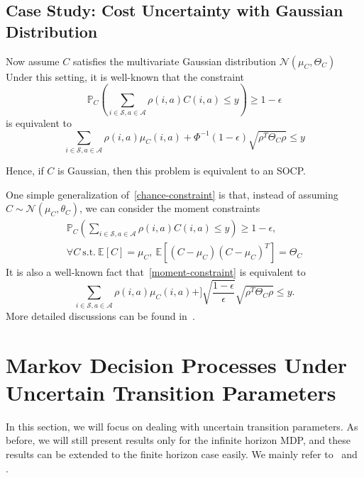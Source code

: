\documentclass[11pt,reqno]{amsart}
\theoremstyle{definition}
\numberwithin{equation}{section}
\theoremstyle{remark}
\begin{document}

\subsection{Case Study: Cost Uncertainty with Gaussian Distribution}
Now assume $C$ satisfies the multivariate Gaussian distribution $\mathcal{N}(\mu_C,\Theta_C)$ Under this setting, it is well-known that the constraint
\begin{equation}\label{chance-constraint}
    \mathbb{P}_C\left(\sum_{i\in\mathcal{S},a\in\mathcal{A}}\rho(i,a)C(i,a)\leq y\right)\geq1-\epsilon
\end{equation}
is equivalent to
\begin{equation}\label{socp}
    \sum_{i\in\mathcal{S},a\in\mathcal{A}}\rho(i,a)\mu_C(i,a)+\Phi^{-1}(1-\epsilon)\sqrt{\rho^T\Theta_C\rho}\leq y
\end{equation}

Hence, if $C$ is Gaussian, then this problem is equivalent to an SOCP.

\medskip

One simple generalization of~\ref{chance-constraint} is that, instead of assuming $C\sim\mathcal{N}(\mu_C,\theta_C)$, we can consider the moment constraints
\begin{equation}\label{moment-constraint}
\begin{gathered}
\mathbb{P}_C\left(\sum_{i\in\mathcal{S},a\in\mathcal{A}}\rho(i,a)C(i,a)\leq y\right)\geq1-\epsilon,\\
\forall C~\text{s.t.}~\mathbb{E}[C]=\mu_C,~\mathbb{E}\left[(C-\mu_C)(C-\mu_C)^T\right]=\Theta_C
\end{gathered}
\end{equation}
It is also a well-known fact that~\ref{moment-constraint} is equivalent to
\begin{equation}\label{generalized-chebyshev}
    \sum_{i\in\mathcal{S},a\in\mathcal{A}}\rho(i,a)\mu_C(i,a)+]\sqrt{\frac{1-\epsilon}{\epsilon}}\sqrt{\rho^T\Theta_C\rho}\leq y.
\end{equation}
More detailed discussions can be found in~\cite{ben2009robust}.

\section{Markov Decision Processes Under Uncertain Transition Parameters}
In this section, we will focus on dealing with uncertain transition parameters. As before, we will still present results only for the infinite horizon MDP, and these results can be extended to the finite horizon case easily. We mainly refer to~\cite{nilim2005robust} and \cite{wiesemann2013robust}.
\end{document}
